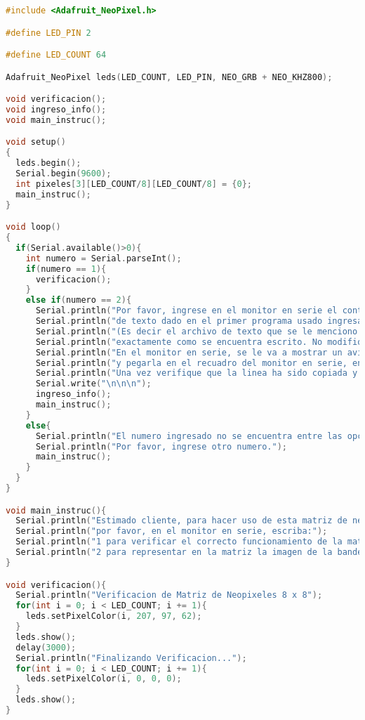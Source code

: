 \documentclass{article}
\begin{document}
\begin{lstlisting}[language=C++, label=prueba_ingresotxtymanualgeneraltink]
#include <Adafruit_NeoPixel.h>

#define LED_PIN 2

#define LED_COUNT 64

Adafruit_NeoPixel leds(LED_COUNT, LED_PIN, NEO_GRB + NEO_KHZ800);

void verificacion();
void ingreso_info();
void main_instruc();

void setup()
{
  leds.begin();
  Serial.begin(9600);
  int pixeles[3][LED_COUNT/8][LED_COUNT/8] = {0};
  main_instruc();
}

void loop()
{
  if(Serial.available()>0){
    int numero = Serial.parseInt();
    if(numero == 1){
      verificacion();
    }
    else if(numero == 2){
      Serial.println("Por favor, ingrese en el monitor en serie el contenido del archivo");
      Serial.println("de texto dado en el primer programa usado ingresando linea por linea,");
      Serial.println("(Es decir el archivo de texto que se le menciono mantener abierto para este segundo programa");
      Serial.println("exactamente como se encuentra escrito. No modifique nada del contenido.");
      Serial.println("En el monitor en serie, se le va a mostrar un aviso para poder copiar 1 linea");
      Serial.println("y pegarla en el recuadro del monitor en serie, en su parte inferior, habilitado para pegar dicha linea.");
      Serial.println("Una vez verifique que la linea ha sido copiada y pegada correctamente, oprima enter para ingresarla.");
      Serial.write("\n\n\n");
      ingreso_info();
      main_instruc();
    }
    else{
      Serial.println("El numero ingresado no se encuentra entre las opciones dadas.");
      Serial.println("Por favor, ingrese otro numero.");
      main_instruc();
    }
  }
}

void main_instruc(){
  Serial.println("Estimado cliente, para hacer uso de esta matriz de neopixeles,");
  Serial.println("por favor, en el monitor en serie, escriba:");
  Serial.println("1 para verificar el correcto funcionamiento de la matriz");
  Serial.println("2 para representar en la matriz la imagen de la bandera escogida en el anterior programa");
}

void verificacion(){
  Serial.println("Verificacion de Matriz de Neopixeles 8 x 8");
  for(int i = 0; i < LED_COUNT; i += 1){
    leds.setPixelColor(i, 207, 97, 62);
  }
  leds.show();
  delay(3000);
  Serial.println("Finalizando Verificacion...");
  for(int i = 0; i < LED_COUNT; i += 1){
    leds.setPixelColor(i, 0, 0, 0);
  }
  leds.show();
}


\end{lstlisting}
\end{document}
